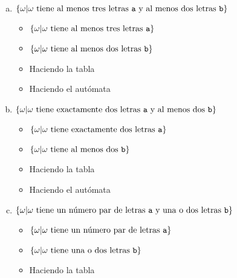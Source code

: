 \documentclass{article}
\begin{document}
\begin{enumerate}[a.]
    \item $\{\omega|\omega\text{ tiene al menos tres letras \texttt{a} y al menos dos letras \texttt{b}}\}$
    \begin{itemize}
        \item $\{\omega|\omega\text{ tiene al menos tres letras \texttt{a}}\}$
        
        
        \item $\{\omega|\omega\text{ tiene al menos dos letras \texttt{b}}\}$
        
        
        \item Haciendo la tabla
        
        
        \item Haciendo el autómata
        
    \end{itemize}
    
    
    \item $\{\omega|\omega\text{ tiene exactamente dos letras \texttt{a} y al menos dos \texttt{b}}\}$
    \begin{itemize}
        \item $\{\omega|\omega\text{ tiene exactamente dos letras \texttt{a}}\}$
        
        
        \item $\{\omega|\omega\text{ tiene al menos dos \texttt{b}}\}$
        
        
        \item Haciendo la tabla
        
        
        \item Haciendo el autómata
        
    \end{itemize}    
    
    \item $\{\omega|\omega\text{ tiene un número par de letras \texttt{a} y una o dos letras \texttt{b}}\}$
    \begin{itemize}
        \item $\{\omega|\omega\text{ tiene un número par de letras \texttt{a}}\}$
        
        
        \item $\{\omega|\omega\text{ tiene una o dos letras \texttt{b}}\}$
        
        
        \item Haciendo la tabla
        
        

\end{itemize}
\end{enumerate}
\end{document}
